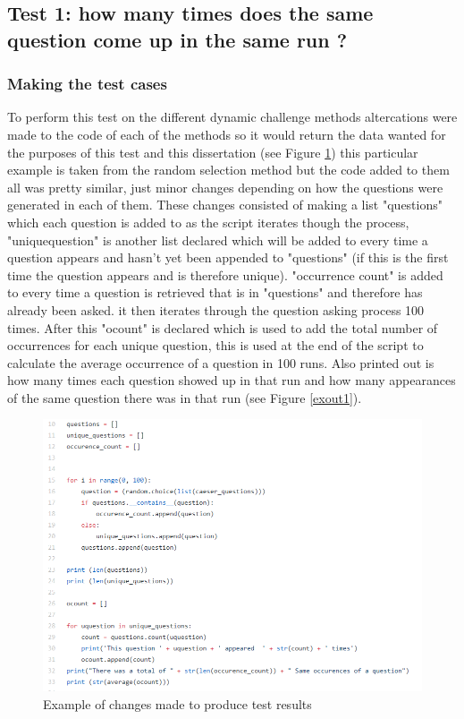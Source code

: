 \documentclass[12pt,a4paper]{article}
\begin{document}
\subsection{Test 1: how many times does the same question come up in the same run ?}  
\subsubsection{Making the test cases} 
To perform this test on the different dynamic challenge methods altercations were made to the code of each of the methods so it would return the data wanted for the purposes of this test and this dissertation (see Figure \ref{testcases}) this particular example is taken from the random selection method but the code added to them all was pretty similar, just minor changes depending on how the questions were generated in each of them. These changes consisted of making a list "questions" which each question is added to as the script iterates though the process, "unique\textunderscore question" is another list declared which will be added to every time a question appears and hasn't yet been appended to "questions" (if this is the first time the question appears and is therefore unique). "occurrence \textunderscore count" is added to every time a question is retrieved that is in "questions" and therefore has already been asked. it then iterates through the question asking process 100 times. After this "ocount" is declared which is used to add the total number of occurrences for each unique question, this is used at the end of the script to calculate the average occurrence of a question in 100 runs. Also printed out is how many times each question showed up in that run and how many appearances of the same question there was in that run (see Figure \ref{exout1}).

\begin{figure}[!ht]
    \centering
    \includegraphics[width=1.0\textwidth]{Figs/testcases.PNG} 
    \caption{Example of changes made to produce test results} 
    \label{testcases}
\end{figure} 
\end{document}
